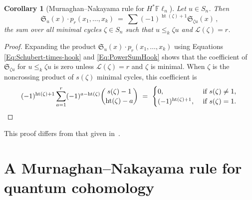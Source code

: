 \documentclass[12pt,oneside,reqno]{amsart}
\newtheorem{corollary}[theorem]{Corollary}
\theoremstyle{definition}
\numberwithin{equation}{section}
\newcommand{\Fln}{{\mathbb F}\ell_n}
\newcommand{\frakS}{{\mathfrak S}}
\newcommand{\calL}{{\mathcal L}}
\DeclareMathOperator{\het}{ht}
\begin{document}
\begin{corollary}[Murnaghan--Nakayama rule for $H^*\Fln$]
    \label{C:classical-schubert-times-powersum}
    Let $u \in S_n$.
    Then
     \begin{equation*}
      \frakS_u(x) \cdot p_r(x_1,\dotsc,x_k)\ =\ \sum (-1)^{\het(\zeta)+1} \frakS_{\zeta u}(x)\,,
     \end{equation*}
    the sum over all minimal cycles $\zeta \in S_n$ such that
    $u\leq_k\zeta u$ and $\calL(\zeta)=r$.
\end{corollary}
\begin{proof}
    Expanding the  product $\frakS_u(x) \cdot p_r(x_1,\dotsc,x_k)$ using Equations
    \eqref{Eq:Schubert-times-hook}
    and
    \eqref{Eq:PowerSumHook}
    shows
    that
    the coefficient of $\frakS_{\zeta u}$ for $u\leq_k\zeta u$ is zero unless
    $\calL(\zeta)=r$ and $\zeta$ is minimal.
    When $\zeta$ is the noncrossing product of $s(\zeta)$ minimal cycles, this coefficient is
    \begin{equation*}
        (-1)^{\het(\zeta)+1} \sum_{a=1}^{r} (-1)^{a-\het(\zeta)}\binom{s(\zeta)-1}{\het(\zeta)-a}\ =\
        \begin{cases}
            0,  & \text{ if } s(\zeta)\neq 1,\\
            (-1)^{\het(\zeta)+1},& \text{ if } s(\zeta)=1.
        \end{cases}
        \qedhere
    \end{equation*}
\end{proof}




This proof differs from that given in~\cite{Morrison, MorrisonSottile}.


\section{A Murnaghan--Nakayama rule for quantum cohomology}
\label{S:qCoh}
\end{document}
